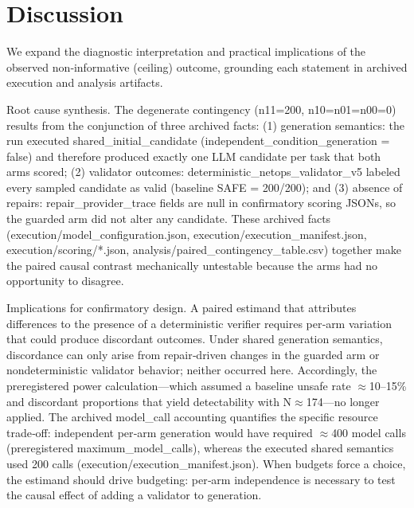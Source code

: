 \documentclass[conference]{IEEEtran}
\begin{document}
\section{Discussion}
We expand the diagnostic interpretation and practical implications of the observed non‑informative (ceiling) outcome, grounding each statement in archived execution and analysis artifacts.

Root cause synthesis. The degenerate contingency (n11=200, n10=n01=n00=0) results from the conjunction of three archived facts: (1) generation semantics: the run executed shared\_initial\_candidate (independent\_condition\_generation = false) and therefore produced exactly one LLM candidate per task that both arms scored; (2) validator outcomes: deterministic\_netops\_validator\_v5 labeled every sampled candidate as valid (baseline SAFE = 200/200); and (3) absence of repairs: repair\_provider\_trace fields are null in confirmatory scoring JSONs, so the guarded arm did not alter any candidate. These archived facts (execution/model\_configuration.json, execution/execution\_manifest.json, execution/scoring/*.json, analysis/paired\_contingency\_table.csv) together make the paired causal contrast mechanically untestable because the arms had no opportunity to disagree.

Implications for confirmatory design. A paired estimand that attributes differences to the presence of a deterministic verifier requires per‑arm variation that could produce discordant outcomes. Under shared generation semantics, discordance can only arise from repair‑driven changes in the guarded arm or nondeterministic validator behavior; neither occurred here. Accordingly, the preregistered power calculation---which assumed a baseline unsafe rate \ensuremath{\approx}10--15\% and discordant proportions that yield detectability with N\ensuremath{\approx}174---no longer applied. The archived model\_call accounting quantifies the specific resource trade‑off: independent per‑arm generation would have required \ensuremath{\approx}400 model calls (preregistered maximum\_model\_calls), whereas the executed shared semantics used 200 calls (execution/execution\_manifest.json). When budgets force a choice, the estimand should drive budgeting: per‑arm independence is necessary to test the causal effect of adding a validator to generation.
\end{document}
